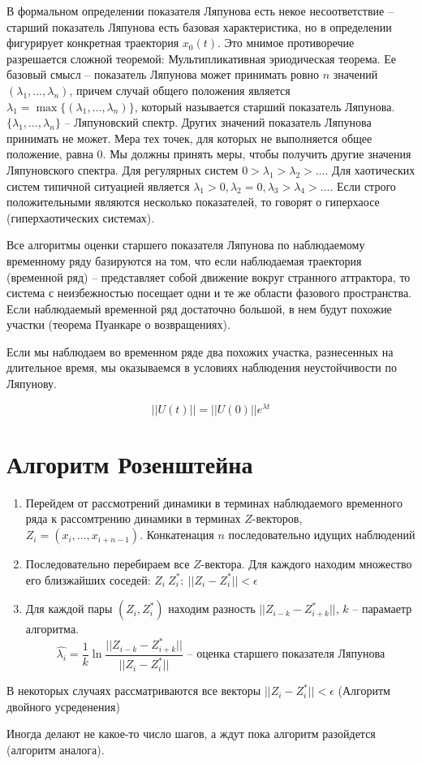 \documentclass[11pt]{article}
\begin{document}
	В формальном определении показателя Ляпунова есть некое несоответствие -- старший показатель Ляпунова есть базовая характеристика, но в определении фигурирует конкретная траектория $x_0(t)$. Это мнимое противоречие разрешается сложной теоремой: Мультипликативная эриодическая теорема. Ее базовый смысл -- показатель Ляпунова может принимать ровно $n$ значений $(\lambda_1, \dots, \lambda_n)$, причем случай общего положения является $\lambda_1 = \max \{ (\lambda_1, \dots, \lambda_n)\}$, который называется старший показатель Ляпунова. $\{\lambda_1, \dots, \lambda_n\}$ -- Ляпуновский спектр. Других значений показатель Ляпунова принимать не может. Мера тех точек, для которых не выполняется общее положение, равна 0. Мы должны принять меры, чтобы получить другие значения Ляпуновского спектра. Для регулярных систем $0>\lambda_1>\lambda_2>\dots$. Для хаотических систем типичной ситуацией является $\lambda_1>0, \lambda_2 = 0, \lambda_3>\lambda_4>\dots$. Если строго положительными являются несколько показателей, то говорят о гиперхаосе (гиперхаотических системах).
	
	Все алгоритмы оценки старшего показателя Ляпунова по наблюдаемому временному ряду базируются на том, что если наблюдаемая траектория (временной ряд) -- представляет собой движение вокруг странного аттрактора, то система с неизбежностью посещает одни и те же области фазового пространства. Если наблюдаемый временной ряд достаточно большой, в нем будут похожие участки (теорема Пуанкаре о возвращениях).
	
	Если мы наблюдаем во временном ряде два похожих участка, разнесенных на длительное время, мы оказываемся в условиях наблюдения неустойчивости по Ляпунову.
	
	$$|| U(t) || = ||U(0)||e^{\lambda t}$$
	
	\section{Алгоритм Розенштейна}
	
	\begin{enumerate}
		\item Перейдем от рассмотрений динамики в терминах наблюдаемого временного ряда к рассомтрению динамики в терминах $Z$-векторов, $Z_i=(x_i,\dots, x_{i+n-1})$. Конкатенация $ n $  последовательно идущих наблюдений
		
		\item Последовательно перебираем все $ Z $-вектора. Для каждого находим множество его близжайших соседей: $Z_i \: Z_i^*: \: ||Z_i - Z_i^*||<\epsilon $
		
		\item Для каждой пары $ (Z_i, Z_i^*) $ находим разность $ ||Z_{i-k} - Z_{i+k}^*|| $, $ k $ -- парамаетр алгоритма. $$ \hat{\lambda_i} = \frac{1}{k} \ln \frac{||Z_{i-k} - Z_{i+k}^*||}{||Z_i - Z_i^*||}\text{ -- оценка старшего показателя Ляпунова}$$
	\end{enumerate}
	
	В некоторых случаях рассматриваются все векторы $||Z_i - Z_i^*||<\epsilon$ (Алгоритм двойного усреденения)
	
	Иногда делают не какое-то число шагов, а ждут пока алгоритм разойдется (алгоритм аналога).
	
\end{document}
